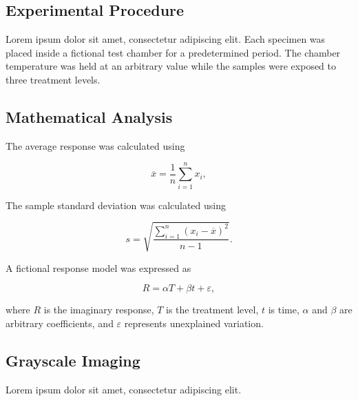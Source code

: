 \documentclass[11pt]{article}
\begin{document}
\subsection{Experimental Procedure}

Lorem ipsum dolor sit amet, consectetur adipiscing elit. Each specimen
was placed inside a fictional test chamber for a predetermined period.
The chamber temperature was held at an arbitrary value while the
samples were exposed to three treatment levels.

\subsection{Mathematical Analysis}

The average response was calculated using

\begin{equation}
\overline{x} =
\frac{1}{n}\sum_{i=1}^{n}x_i,
\label{eq:mean}
\end{equation}


The sample standard deviation was calculated using

\begin{equation}
s =
\sqrt{
\frac{\sum_{i=1}^{n}(x_i-\overline{x})^2}
{n-1}
}.
\label{eq:standarddeviation}
\end{equation}

A fictional response model was expressed as

\begin{equation}
R = \alpha T + \beta t + \varepsilon,
\label{eq:model}
\end{equation}

where \(R\) is the imaginary response, \(T\) is the treatment level,
\(t\) is time, \(\alpha\) and \(\beta\) are arbitrary coefficients,
and \(\varepsilon\) represents unexplained variation.

\subsection{Grayscale Imaging}

Lorem ipsum dolor sit amet, consectetur adipiscing elit. 
\end{document}
